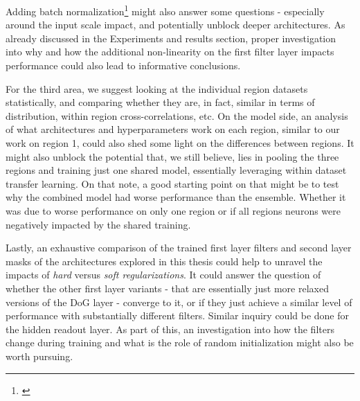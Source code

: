 Adding batch normalization\footnote{\citep{2015arXiv150203167I}} might also answer some questions - especially around the input scale impact, and potentially unblock deeper architectures. As already discussed in the Experiments and results section, proper investigation into why and how the additional non-linearity on the first filter layer impacts performance could also lead to informative conclusions.

For the third area, we suggest looking at the individual region datasets statistically, and comparing whether they are, in fact, similar in terms of distribution, within region cross-correlations, etc. On the model side, an analysis of what architectures and hyperparameters work on each region, similar to our work on region 1, could also shed some light on the differences between regions. It might also unblock the potential that, we still believe, lies in pooling the three regions and training just one shared model, essentially leveraging within dataset transfer learning. On that note, a good starting point on that might be to test why the combined model had worse performance than the ensemble. Whether it was due to worse performance on only one region or if all regions neurons were negatively impacted by the shared training.

Lastly, an exhaustive comparison of the trained first layer filters and second layer masks of the architectures explored in this thesis could help to unravel the impacts of \textit{hard} versus \textit{soft regularizations}. It could answer the question of whether the other first layer variants - that are essentially just more relaxed versions of the DoG layer - converge to it, or if they just achieve a similar level of performance with substantially different filters. Similar inquiry could be done for the hidden readout layer. As part of this, an investigation into how the filters change during training and what is the role of random initialization might also be worth pursuing.
